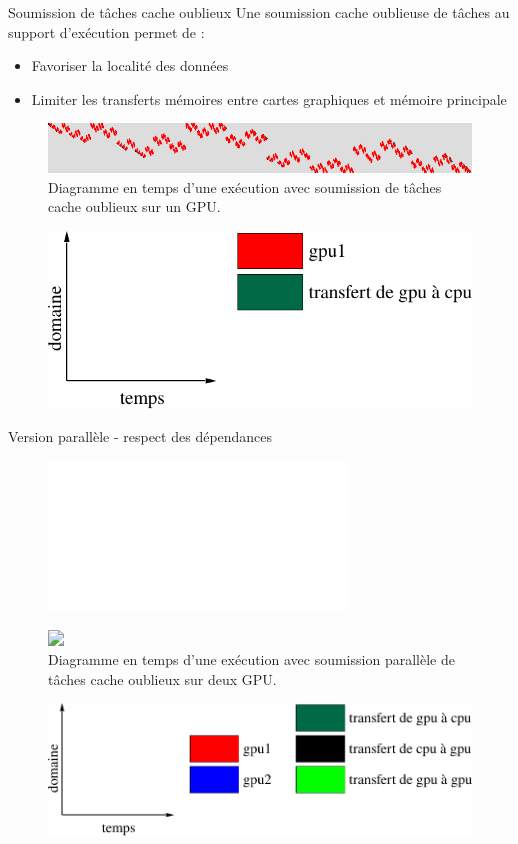 \documentclass[9pt]{beamer}
\begin{document}
\begin{frame}{\textcolor{inriaGrey}{Soumission de tâches cache oublieux}}
  \vfill
  Une soumission cache oublieuse de tâches au support d'exécution permet de :
  \vfill
  \begin{itemize}
  \item<2-> Favoriser la localité des données \vfill
  \item<3-> Limiter les transferts mémoires entre cartes graphiques et mémoire
    principale
  \end{itemize}
  \vfill
  \begin{figure}
    \centering
    \includegraphics[width=1\linewidth]{img/co-gpu1.png}
    \caption{Diagramme en temps d'une exécution avec soumission de tâches cache
      oublieux sur un GPU.}
  \end{figure}
  \begin{figure}
    \centering
    \includegraphics[width=0.5\linewidth]{img/xpm-legend-gpu1-nt.pdf}
  \end{figure}
\end{frame}

\begin{frame}{\textcolor{inriaGrey}{Version parallèle - respect des dépendances}}
  \vfill
  \begin{figure}
    \centering
    \includegraphics<1->[width=1\linewidth]{img/co-gpu2-nomirror.pdf}
  \end{figure}
  \begin{figure}
    \centering
    \includegraphics<2->[width=0.8\linewidth]{img/co-gpu2-mirror.png}
    \caption{Diagramme en temps d'une exécution avec soumission parallèle de
      tâches cache oublieux sur deux GPU.}
  \end{figure}
  \begin{figure}
    \centering
    \includegraphics[width=0.6\linewidth]{img/xpm-legend-gpu2.pdf}
  \end{figure}
  \vfill
\end{frame}
\end{document}
